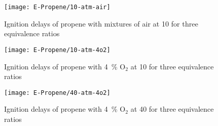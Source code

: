 \documentclass[../main.tex]{subfiles}
\begin{document}
\begin{figure}
    \begin{floatrow}
        \ffigbox
            {\texttt{[image: E-Propene/10-atm-air]}}
            {\caption{Ignition delays of propene with mixtures of air at
            \SI{10}{\atmosphere} for three equivalence ratios}
            \label{fig:10-atm-air}}
    \end{floatrow}
\end{figure}

\begin{figure}
    \begin{floatrow}
        \ffigbox
            {\texttt{[image: E-Propene/10-atm-4o2]}}
            {\caption{Ignition delays of propene with \SI{4}{\percent}
            O$_2$ at \SI{10}{\atmosphere} for three equivalence ratios}
            \label{fig:10-atm-4o2}}
        \ffigbox
            {\texttt{[image: E-Propene/40-atm-4o2]}}
            {\caption{Ignition delays of propene with \SI{4}{\percent}
            O$_2$ at \SI{40}{\atmosphere} for three equivalence ratios}
            \label{fig:40-atm-4o2}}
    \end{floatrow}
\end{figure}
\end{document}

